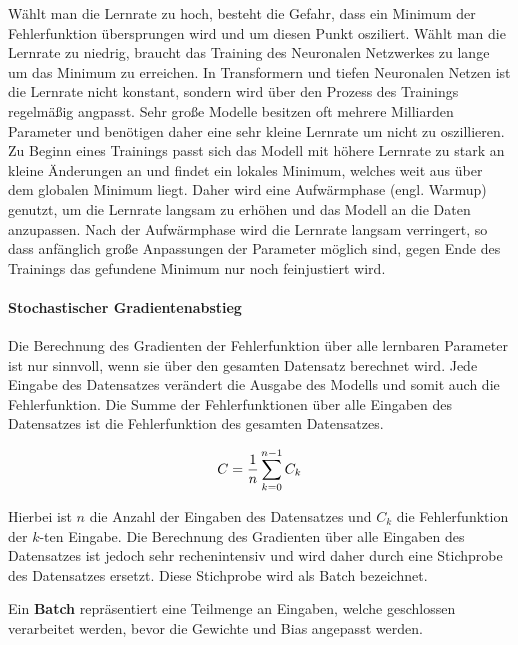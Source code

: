 Wählt man die Lernrate zu hoch, besteht die Gefahr, dass ein Minimum der Fehlerfunktion übersprungen wird und um diesen Punkt osziliert.
Wählt man die Lernrate zu niedrig, braucht das Training des Neuronalen Netzwerkes zu lange um das Minimum zu erreichen.
In Transformern und tiefen Neuronalen Netzen ist die Lernrate nicht konstant, sondern wird über den Prozess des Trainings regelmäßig angpasst.
Sehr große Modelle besitzen oft mehrere Milliarden Parameter und benötigen daher eine sehr kleine Lernrate um nicht zu oszillieren.
Zu Beginn eines Trainings passt sich das Modell mit höhere Lernrate zu stark an kleine Änderungen an und findet ein lokales Minimum, welches weit aus über dem globalen Minimum liegt.
Daher wird eine Aufwärmphase (engl. Warmup) genutzt, um die Lernrate langsam zu erhöhen und das Modell an die Daten anzupassen.
Nach der Aufwärmphase wird die Lernrate langsam verringert, so dass anfänglich große Anpassungen der Parameter möglich sind, gegen Ende des Trainings das gefundene Minimum nur noch feinjustiert wird.\\

\paragraph{Stochastischer Gradientenabstieg}
Die Berechnung des Gradienten der Fehlerfunktion über alle lernbaren Parameter ist nur sinnvoll, wenn sie über den gesamten Datensatz berechnet wird.
Jede Eingabe des Datensatzes verändert die Ausgabe des Modells und somit auch die Fehlerfunktion.
Die Summe der Fehlerfunktionen über alle Eingaben des Datensatzes ist die Fehlerfunktion des gesamten Datensatzes.

\begin{equation}
    C = \frac{1}{n}\sum_{k=0}^{n-1}C_k\\
\end{equation}

Hierbei ist $n$ die Anzahl der Eingaben des Datensatzes und $C_k$ die Fehlerfunktion der $k$-ten Eingabe.
Die Berechnung des Gradienten über alle Eingaben des Datensatzes ist jedoch sehr rechenintensiv und wird daher durch eine Stichprobe des Datensatzes ersetzt.
Diese Stichprobe wird als Batch bezeichnet.\\

\begin{definition}\label{def:batch}
    Ein \textbf{Batch} repräsentiert eine Teilmenge an Eingaben, welche geschlossen verarbeitet werden, bevor die Gewichte und Bias angepasst werden.
\end{definition}

